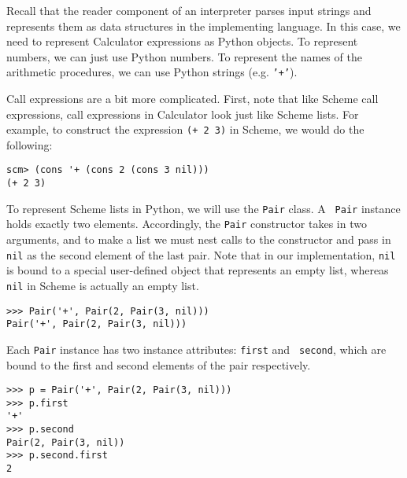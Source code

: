 Recall that the reader component of an interpreter parses input strings and
represents them as data structures in the implementing language. In this case,
we need to represent Calculator expressions as Python objects. To represent
numbers, we can just use Python numbers. To represent the names of the
arithmetic procedures, we can use Python strings (e.g. \texttt{'+'}).

Call expressions are a bit more complicated. First, note that like Scheme call
expressions, call expressions in Calculator look just like Scheme lists.  For
example, to construct the expression {\tt (+ 2 3)} in Scheme, we would do the
following:

\begin{lstlisting}
scm> (cons '+ (cons 2 (cons 3 nil)))
(+ 2 3)
\end{lstlisting}

To represent Scheme lists in Python, we will use the {\tt Pair} class.  A {\tt
Pair} instance holds exactly two elements. Accordingly, the {\tt Pair}
constructor takes in two arguments, and to make a list we must nest calls to
the constructor and pass in {\tt nil} as the second element of the last pair.
Note that in our implementation, {\tt nil} is bound to a special user-defined
object that represents an empty list, whereas {\tt nil} in Scheme is actually
an empty list.

\begin{lstlisting}
>>> Pair('+', Pair(2, Pair(3, nil)))
Pair('+', Pair(2, Pair(3, nil)))
\end{lstlisting}

Each {\tt Pair} instance has two instance attributes: {\tt first} and {\tt
second}, which are bound to the first and second elements of the pair
respectively.

\begin{lstlisting}
>>> p = Pair('+', Pair(2, Pair(3, nil)))
>>> p.first
'+'
>>> p.second
Pair(2, Pair(3, nil))
>>> p.second.first
2
\end{lstlisting}

%
